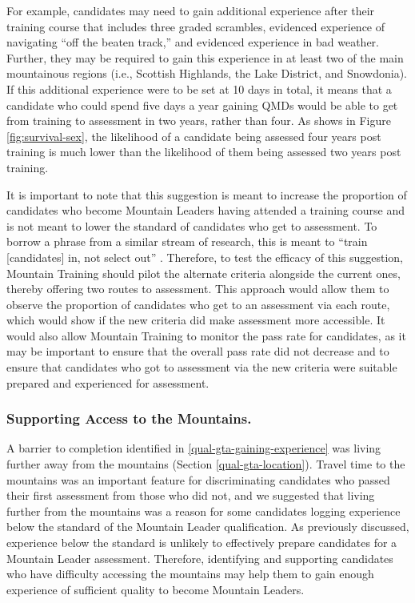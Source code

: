 \documentclass[
  12pt,
  a4paper,
]{book}
\begin{document}
For example, candidates may need to gain additional experience after their training course that includes three graded scrambles, evidenced experience of navigating ``off the beaten track,'' and evidenced experience in bad weather. Further, they may be required to gain this experience in at least two of the main mountainous regions (i.e., Scottish Highlands, the Lake District, and Snowdonia). If this additional experience were to be set at 10 days in total, it means that a candidate who could spend five days a year gaining QMDs would be able to get from training to assessment in two years, rather than four. As shows in Figure \ref{fig:survival-sex}, the likelihood of a candidate being assessed four years post training is much lower than the likelihood of them being assessed two years post training.

It is important to note that this suggestion is meant to increase the proportion of candidates who become Mountain Leaders having attended a training course and is not meant to lower the standard of candidates who get to assessment. To borrow a phrase from a similar stream of research, this is meant to ``train {[}candidates{]} in, not select out'' \citep{Hardy2014d}. Therefore, to test the efficacy of this suggestion, Mountain Training should pilot the alternate criteria alongside the current ones, thereby offering two routes to assessment. This approach would allow them to observe the proportion of candidates who get to an assessment via each route, which would show if the new criteria did make assessment more accessible. It would also allow Mountain Training to monitor the pass rate for candidates, as it may be important to ensure that the overall pass rate did not decrease and to ensure that candidates who got to assessment via the new criteria were suitable prepared and experienced for assessment.

\hypertarget{supporting-access-to-the-mountains.}{%
\subsubsection{Supporting Access to the Mountains.}\label{supporting-access-to-the-mountains.}}

A barrier to completion identified in \ref{qual-gta-gaining-experience} was living further away from the mountains (Section \ref{qual-gta-location}). Travel time to the mountains was an important feature for discriminating candidates who passed their first assessment from those who did not, and we suggested that living further from the mountains was a reason for some candidates logging experience below the standard of the Mountain Leader qualification. As previously discussed, experience below the standard is unlikely to effectively prepare candidates for a Mountain Leader assessment. Therefore, identifying and supporting candidates who have difficulty accessing the mountains may help them to gain enough experience of sufficient quality to become Mountain Leaders.
\end{document}
